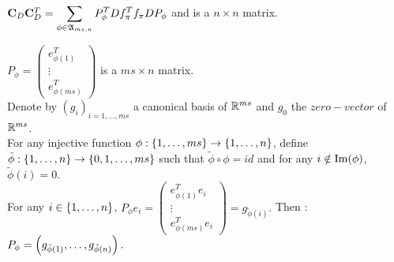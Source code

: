   
 $\bold{C}_{D} \bold{C}_{D}^{T} = \displaystyle\sum\limits_{\phi\in\mathfrak{A}_{ms,n}} P_{\phi}^{T} D f_{\pi}^{T} f_{\pi} D P_{\phi}$ and is a $n\times n$ matrix.\\


\pr 

$P_{\phi} = \begin{pmatrix} e_{\phi(1)}^{T} \\ \vdots \\ e_{\phi(ms)}^{T} \end{pmatrix} $ is a $ms \times n$ matrix.\\
Denote by $(g_{i})_{i=1,\dots,ms}$ a canonical basis of ${\mathbb R}^{ms}$ and $g_{0}$ the $zero-vector$ of ${\mathbb R}^{ms}$.\\
For any injective function $\phi : \left\{1,\dots,ms\right\} \rightarrow \left\{1,\dots,n\right\}$, define $\tilde{\phi} : \left\{1,\dots,n\right\} \rightarrow \left\{0,1,\dots,ms\right\}$ such that $\tilde{\phi}\circ\phi = id$ and for any $i\notin \operatorname{Im}(\phi)$, $\tilde{\phi}(i) = 0$.\\
For any $i\in \left\{1,\dots,n\right\}$, $P_{\phi}e_{i} = \begin{pmatrix} e_{\phi(1)}^{T}e_{i} \\ \vdots \\ e_{\phi(ms)}^{T}e_{i} \end{pmatrix} = g_{\tilde{\phi}(i)}.$ Then : $P_{\phi} = \left( g_{\tilde{\phi}(1)},\dots,g_{\tilde{\phi}(n)}\right).$\\

